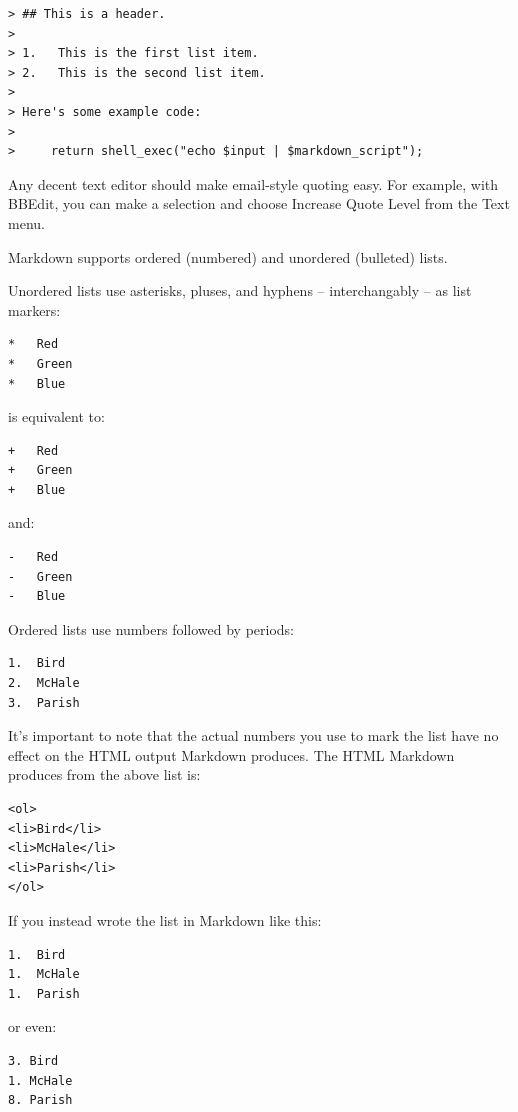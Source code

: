 \begin{verbatim}
> ## This is a header.
> 
> 1.   This is the first list item.
> 2.   This is the second list item.
> 
> Here's some example code:
> 
>     return shell_exec("echo $input | $markdown_script");
\end{verbatim}

Any decent text editor should make email-style quoting easy. For
example, with BBEdit, you can make a selection and choose Increase
Quote Level from the Text menu.

Markdown supports ordered (numbered) and unordered (bulleted) lists.

Unordered lists use asterisks, pluses, and hyphens -- interchangably
-- as list markers:

\begin{verbatim}
*   Red
*   Green
*   Blue
\end{verbatim}

is equivalent to:

\begin{verbatim}
+   Red
+   Green
+   Blue
\end{verbatim}

and:

\begin{verbatim}
-   Red
-   Green
-   Blue
\end{verbatim}

Ordered lists use numbers followed by periods:

\begin{verbatim}
1.  Bird
2.  McHale
3.  Parish
\end{verbatim}

It's important to note that the actual numbers you use to mark the
list have no effect on the HTML output Markdown produces. The HTML
Markdown produces from the above list is:

\begin{verbatim}
<ol>
<li>Bird</li>
<li>McHale</li>
<li>Parish</li>
</ol>
\end{verbatim}

If you instead wrote the list in Markdown like this:

\begin{verbatim}
1.  Bird
1.  McHale
1.  Parish
\end{verbatim}

or even:

\begin{verbatim}
3. Bird
1. McHale
8. Parish
\end{verbatim}

